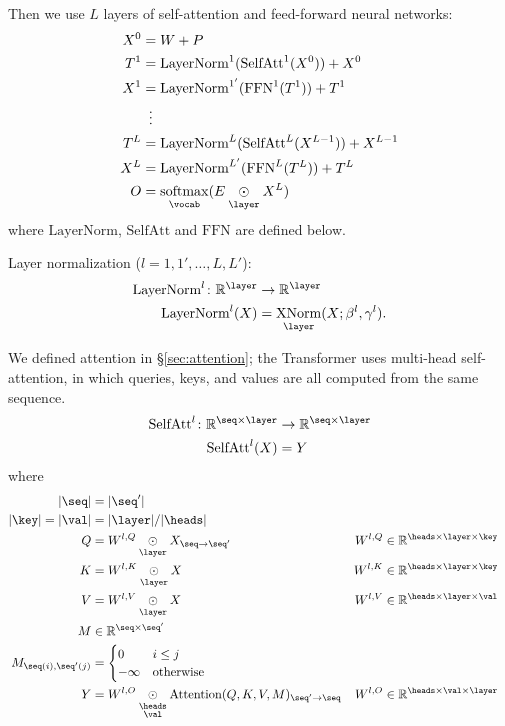 \documentclass{article}
\newcommand{\reals}{\mathbb{R}}
\begin{document}
Then we use $L$ layers of self-attention and feed-forward neural networks:
\begin{align*} 
X^0 &= W+P \\
T^1 &= \text{LayerNorm}^1(\text{SelfAtt}^1(X^0)) + X^0\\
X^1 &= \text{LayerNorm}^{1'}(\text{FFN}^1(T^1)) + T^1\\
&\vdotswithin{=} \\
T^{L} &= \text{LayerNorm}^L(\text{SelfAtt}^L(X^{L-1})) + X^{L-1}\\
X^{L} &= \text{LayerNorm}^{L'}(\text{FFN}^L(T^L)) + T^L\\
O &= \nfun{\vocab}{softmax}(E \ndot{\layer} X^L)
\end{align*}
where $\text{LayerNorm}$, $\text{SelfAtt}$ and $\text{FFN}$ are defined below.

Layer normalization ($l = 1, 1', \ldots, L, L'$):
\begin{align*}
  \text{LayerNorm}^l \colon \mathbb{R}^{\layer} &\rightarrow \mathbb{R}^{\layer} \\
  \text{LayerNorm}^l(X) &= \nfun{\layer}{XNorm}(X; \beta^l, \gamma^l).
\end{align*}

We defined attention in \S\ref{sec:attention}; the Transformer uses multi-head self-attention, in which queries, keys, and values are all computed from the same sequence.
\begin{align*}
  \text{SelfAtt}^l \colon \mathbb{R}^{\seq \times \layer} &\rightarrow \mathbb{R}^{\seq \times \layer} \\
  \text{SelfAtt}^l(X) &= Y
\end{align*}
where
\begin{align*}
  |\seq| &= |\seq'| \\
  |\key| = |\val| &= |\layer|/|\heads| \\
  Q &= W^{l,Q} \ndot{\layer} X_{\seq\rightarrow\seq'} & W^{l,Q} &\in \mathbb{R}^{\heads \times \layer \times \key} \\
  K &= W^{l,K} \ndot{\layer} X & W^{l,K} &\in \mathbb{R}^{\heads \times \layer \times \key} \\
  V &= W^{l,V} \ndot{\layer} X & W^{l,V} &\in \mathbb{R}^{\heads \times \layer \times \val} \\
  M & \in \reals^{\seq \times \seq'} \\
  M_{\seq(i), \seq'(j)} &= \begin{cases}
    0 & i \leq j\\
    -\infty & \text{otherwise}
  \end{cases} \\
  Y &= W^{l,O} \ndot{\heads \\ \val} \text{Attention}(Q, K, V, M)_{\seq'\rightarrow\seq} & W^{l,O} &\in \mathbb{R}^{\heads \times \val \times \layer}
\end{align*}
\end{document}
